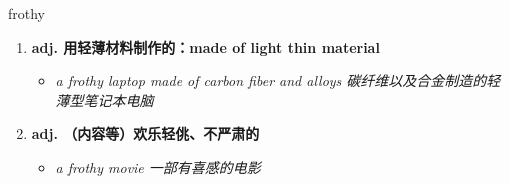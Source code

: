 
\begin{frame}
{\huge frothy}
\begin{center}
\begin{enumerate}\Large
  \item \textbf{adj. 用轻薄材料制作的：made of light thin material}
  \begin{itemize}
    \item \em{\Large{a frothy laptop made of carbon fiber and alloys 碳纤维以及合金制造的轻薄型笔记本电脑}}
  \end{itemize}
  \item \textbf{adj. （内容等）欢乐轻佻、不严肃的}
  \begin{itemize}
    \item \em{\Large{a frothy movie 一部有喜感的电影}}
  \end{itemize}
\end{enumerate}
\end{center}
\end{frame}

